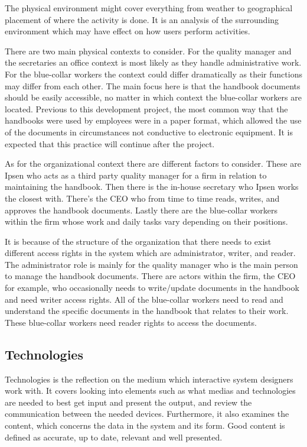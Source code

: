 The physical environment might cover everything from weather to geographical placement of where the activity is done.
It is an analysis of the surrounding environment which may have effect on how users perform activities.

There are two main physical contexts to consider.
For the quality manager and the secretaries an office context is most likely as they handle administrative work.
For the blue-collar workers the context could differ dramatically as their functions may differ from each other.
The main focus here is that the handbook documents should be easily accessible, no matter in which context the blue-collar workers are located.
Previous to this development project, the most common way that the handbooks were used by employees were in a paper format, which allowed the use of the documents in circumstances not conductive to electronic equipment.
It is expected that this practice will continue after the project.

As for the organizational context there are different factors to consider.
These are Ipsen who acts as a third party quality manager for a firm in relation to maintaining the handbook.
Then there is the in-house secretary who Ipsen works the closest with.
There's the CEO who from time to time reads, writes, and approves the handbook documents.
Lastly there are the blue-collar workers within the firm whose work and daily tasks vary depending on their positions.

It is because of the structure of the organization that there needs to exist different access rights in the system which are administrator, writer, and reader.
The administrator role is mainly for the quality manager who is the main person to manage the handbook documents.
There are actors within the firm, the CEO for example, who occasionally needs to write/update documents in the handbook and need writer access rights.
All of the blue-collar workers need to read and understand the specific documents in the handbook that relates to their work.
These blue-collar workers need reader rights to access the documents.

\subsection{Technologies}
Technologies is the reflection on the medium which interactive system designers work with.
It covers looking into elements such as what medias and technologies are needed to best get input and present the output, and review the communication between the needed devices.
Furthermore, it also examines the content, which concerns the data in the system and its form.
Good content is defined as accurate, up to date, relevant and well presented.

